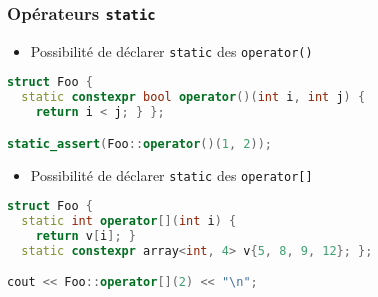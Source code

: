 \documentclass[C++.tex]{subfiles}
\begin{document}
\begin{frame}[fragile]
	\frametitle{Opérateurs \lstinline|static|}
	 \begin{itemize}
	 	\item Possibilité de déclarer \lstinline|static| des \lstinline|operator()|
	 \end{itemize}
	 	
 	\begin{lstlisting}[language=C++]
struct Foo {
  static constexpr bool operator()(int i, int j) {
    return i < j; } };

static_assert(Foo::operator()(1, 2));\end{lstlisting}

	 \begin{itemize}
	 	\item Possibilité de déclarer \lstinline|static| des \lstinline|operator[]|
	 \end{itemize}

 	\begin{lstlisting}[language=C++]
struct Foo {
  static int operator[](int i) {
    return v[i]; }
  static constexpr array<int, 4> v{5, 8, 9, 12}; };

cout << Foo::operator[](2) << "\n";\end{lstlisting}


\end{frame}
\end{document}
